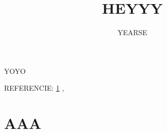\documentclass{article}
\title{HEYYY}
\author{YEARSE}
\begin{document}
\maketitle \vfill \tableofcontents \newpage

YOYO

\epish




REFERENCIE: \ref{sec:AAA} , \pageref{sec:AAA} 




\section{AAA} \label{sec:AAA}



\end{document}
